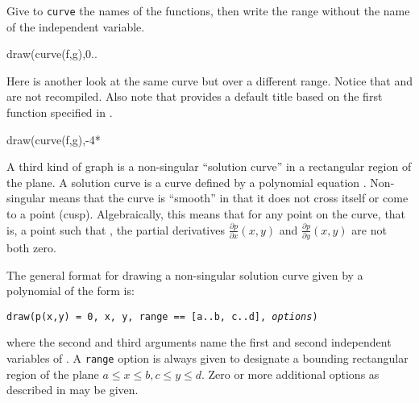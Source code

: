 \begin{psXtc}
\begin{xtccomment}
Give to {\tt curve} the names of the functions,
then write the range without the name of the
independent variable.
\end{xtccomment}
\begin{spadsrc}
draw(curve(f,g),0..%
\end{spadsrc}
\end{psXtc}
%
%
\begin{psXtc}
\begin{xtccomment}
Here is another look at the same curve but over a different
range. Notice that  and  are not recompiled.
Also note that \Language{} provides a default title based on
the first function specified in .
\end{xtccomment}
\begin{spadsrc}
draw(curve(f,g),-4*%
\end{spadsrc}
\end{psXtc}


A third kind of \twodim{} graph is a non-singular ``solution curve''
in a rectangular region of the plane.
A solution curve is a curve defined by a polynomial equation
.
Non-singular means that the curve is ``smooth'' in that it does not
cross itself or come to a point (cusp).
Algebraically, this means that for any point  on the curve,
that is, a point such that , the partial derivatives
  $\frac{\partial p}{\partial x}(x,y)$ and
  $\frac{\partial p}{\partial y}(x,y)$
are not both zero.

%
\beginImportant
The general format for drawing a non-singular solution curve
given by a polynomial of the form  is:
%
\begin{center}
{\tt draw(p(x,y) = 0, x, y, range == [a..b, c..d], {\it options})}
\end{center}
where the second and third arguments name the first and second
independent variables of .
A {\tt range} option is always given to designate a bounding
rectangular region of the plane
$a \leq x \leq b, c \leq y\leq d$.
Zero or more additional options as described in
 may be given.
\endImportant

